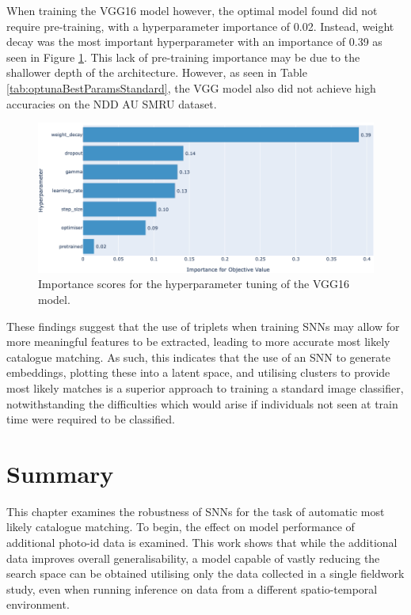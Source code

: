 When training the VGG16 model however, the optimal model found did not require pre-training, with a hyperparameter importance of 0.02. Instead, weight decay was the most important hyperparameter with an importance of 0.39 as seen in Figure \ref{fig:vgg16baseline-hyperparam-importance-optuna}. This lack of pre-training importance may be due to the shallower depth of the architecture. However, as seen in Table \ref{tab:optunaBestParamsStandard}, the VGG model also did not achieve high accuracies on the NDD AU SMRU dataset. 

\begin{figure}
	\begin{center}
		\includegraphics[scale=0.4]{Chapter6/figs/vgg16-baseline-hyperparam-importance-optuna-updated.png}
	\end{center}
	\caption{Importance scores for the hyperparameter tuning of the VGG16 model.}
	\label{fig:vgg16baseline-hyperparam-importance-optuna}
\end{figure}

These findings suggest that the use of triplets when training SNNs may allow for more meaningful features to be extracted, leading to more accurate most likely catalogue matching. As such, this indicates that the use of an SNN to generate embeddings, plotting these into a latent space, and utilising clusters to provide most likely matches is a superior approach to training a standard image classifier, notwithstanding the difficulties which would arise if individuals not seen at train time were required to be classified.

\section{Summary}\label{ch:SNNEvaluation,sec:Summary}

This chapter examines the robustness of SNNs for the task of automatic most likely catalogue matching. To begin, the effect on model performance of additional photo-id data is examined. This work shows that while the additional data improves overall generalisability, a model capable of vastly reducing the search space can be obtained utilising only the data collected in a single fieldwork study, even when running inference on data from a different spatio-temporal environment.

